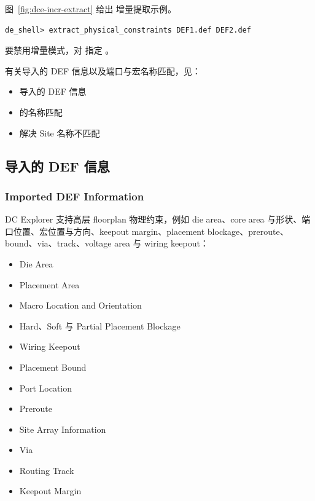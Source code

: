 图~\ref{fig:dce-incr-extract} 给出  增量提取示例。


\begin{lstlisting}
de_shell> extract_physical_constraints DEF1.def DEF2.def
\end{lstlisting}

要禁用增量模式，对  指定 。

有关导入的 DEF 信息以及端口与宏名称匹配，见：
\begin{itemize}
  \item 导入的 DEF 信息
  \item {} 的名称匹配
  \item 解决 Site 名称不匹配
\end{itemize}

\subsection{导入的 DEF 信息}
\subsubsection*{Imported DEF Information}

DC Explorer 支持高层 floorplan 物理约束，例如 die area、core area 与形状、端口位置、宏位置与方向、keepout margin、placement blockage、preroute、bound、via、track、voltage area 与 wiring keepout：
\begin{itemize}
  \item Die Area
  \item Placement Area
  \item Macro Location and Orientation
  \item Hard、Soft 与 Partial Placement Blockage
  \item Wiring Keepout
  \item Placement Bound
  \item Port Location
  \item Preroute
  \item Site Array Information
  \item Via
  \item Routing Track
  \item Keepout Margin
\end{itemize}

